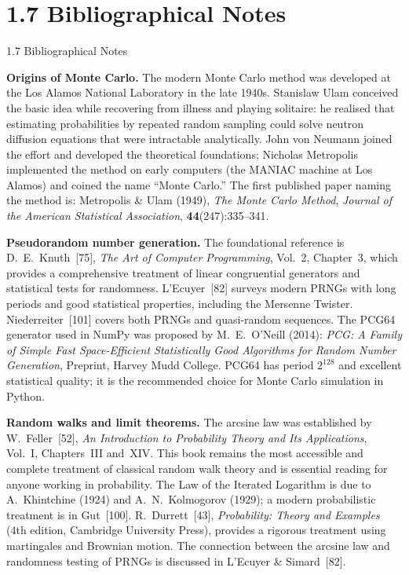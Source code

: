 \documentclass[aspectratio=169,10pt]{beamer}
\begin{document}
\section{1.7 Bibliographical Notes}

\begin{frame}[allowframebreaks]{1.7 Bibliographical Notes}

  \textbf{Origins of Monte Carlo.}  The modern Monte Carlo method was developed
  at the Los Alamos National Laboratory in the late 1940s.  Stanislaw Ulam
  conceived the basic idea while recovering from illness and playing solitaire:
  he realised that estimating probabilities by repeated random sampling could
  solve neutron diffusion equations that were intractable analytically.  John
  von Neumann joined the effort and developed the theoretical foundations;
  Nicholas Metropolis implemented the method on early computers (the MANIAC
  machine at Los Alamos) and coined the name ``Monte Carlo.''  The first
  published paper naming the method is: Metropolis \& Ulam (1949),
  \textit{The Monte Carlo Method}, \textit{Journal of the American Statistical
  Association}, \textbf{44}(247):335--341.

  \textbf{Pseudorandom number generation.}  The foundational reference is
  D.~E.~Knuth~[75], \textit{The Art of Computer Programming}, Vol.~2,
  Chapter~3, which provides a comprehensive treatment of linear congruential
  generators and statistical tests for randomness.  L'Ecuyer~[82] surveys modern
  PRNGs with long periods and good statistical properties, including the Mersenne
  Twister.  Niederreiter~[101] covers both PRNGs and quasi-random sequences.
  The PCG64 generator used in NumPy was proposed by M.~E.~O'Neill (2014):
  \textit{PCG: A Family of Simple Fast Space-Efficient Statistically Good
  Algorithms for Random Number Generation}, Preprint, Harvey Mudd College.
  PCG64 has period $2^{128}$ and excellent statistical quality; it is the
  recommended choice for Monte Carlo simulation in Python.

  \framebreak

  \textbf{Random walks and limit theorems.}  The arcsine law was established by
  W.~Feller~[52], \textit{An Introduction to Probability Theory and Its
  Applications}, Vol.~I, Chapters~III and~XIV.  This book remains the most
  accessible and complete treatment of classical random walk theory and is
  essential reading for anyone working in probability.  The Law of the Iterated
  Logarithm is due to A.~Khintchine (1924) and A.~N.~Kolmogorov (1929); a
  modern probabilistic treatment is in Gut~[100].  R.~Durrett~[43],
  \textit{Probability: Theory and Examples} (4th edition, Cambridge University
  Press), provides a rigorous treatment using martingales and Brownian motion.
  The connection between the arcsine law and randomness testing of PRNGs is
  discussed in L'Ecuyer \& Simard~[82].


\end{frame}
\end{document}
